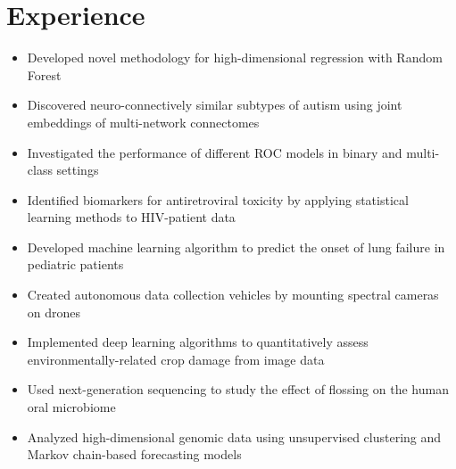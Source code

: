 \section{Experience}

{
\begin{itemize}
    \item Developed novel methodology for high-dimensional regression with Random Forest
    \item Discovered neuro-connectively similar subtypes of autism using joint embeddings of multi-network connectomes
\end{itemize}
}

{
\begin{itemize}
    \item Investigated the performance of different ROC models in binary and multi-class settings
    \item Identified biomarkers for antiretroviral toxicity by applying statistical learning methods to HIV-patient data
\end{itemize}{}
}

{
\begin{itemize}
    \item Developed machine learning algorithm to predict the onset of lung failure in pediatric patients
\end{itemize}{}
}

{
\begin{itemize}
    \item Created autonomous data collection vehicles by mounting spectral cameras on drones
    \item Implemented deep learning algorithms to quantitatively assess environmentally-related crop damage from image data
\end{itemize}{}
}

{
\begin{itemize}
    \item Used next-generation sequencing to study the effect of flossing on the human oral microbiome
    \item Analyzed high-dimensional genomic data using unsupervised clustering and Markov chain-based forecasting models
\end{itemize}{}
}